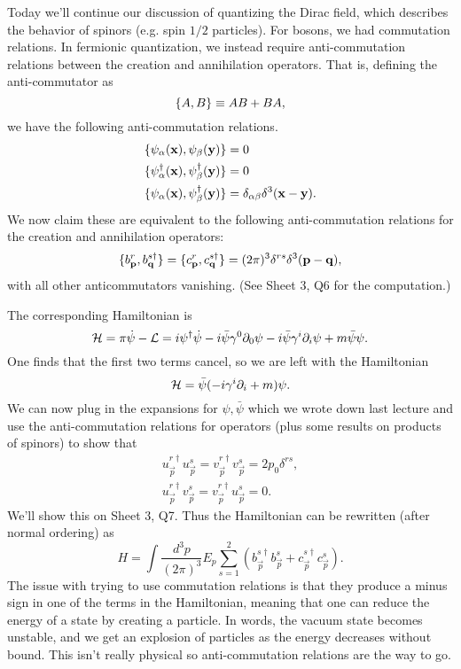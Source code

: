 Today we'll continue our discussion of quantizing the Dirac field, which describes the behavior of spinors (e.g. spin $1/2$ particles). For bosons, we had commutation relations. In fermionic quantization, we instead require anti-commutation relations between the creation and annihilation operators. That is, defining the anti-commutator as
$$\{A,B\}\equiv AB+BA,$$
we have the following anti-commutation relations.
\begin{align*}
    \{\psi_\alpha(\boldsymbol{\mathbf{x}}),\psi_\beta (\boldsymbol{\mathbf{y}})\}&=0\\
    \{\psi_\alpha^\dagger(\boldsymbol{\mathbf{x}}),\psi_\beta^\dagger(\boldsymbol{\mathbf{y}})\}&=0\\
    \{\psi_\alpha(\boldsymbol{\mathbf{x}}),\psi_\beta^\dagger(\boldsymbol{\mathbf{y}})\}&=\delta_{\alpha\beta}\delta^3(\boldsymbol{\mathbf{x}} -\boldsymbol{\mathbf{y}}).
\end{align*}
We now claim these are equivalent to the following anti-commutation relations for the creation and annihilation operators:
$$\{b_{\boldsymbol{\mathbf{p}}}^r,b_{\boldsymbol{\mathbf{q}}}^{s\dagger}\}=\{c_{\boldsymbol{\mathbf{p}}}^r, c_{\boldsymbol{\mathbf{q}}}^{s\dagger}\}=(2\pi)^3 \delta^{rs}\delta^3(\boldsymbol{\mathbf{p}} -\boldsymbol{\mathbf{q}}),$$
with all other anticommutators vanishing. (See Sheet 3, Q6 for the computation.)

The corresponding Hamiltonian is
$$\mathcal H=\pi \dot \psi -\mathcal L=i\psi^\dagger \dot \psi-i\bar \psi \gamma^0 \partial_0 \psi -i\bar \psi \gamma^i \partial_i \psi+m\bar \psi \psi.$$
One finds that the first two terms cancel, so we are left with the Hamiltonian
$$\mathcal H=\bar \psi(-i \gamma^i \partial_i +m) \psi.$$
We can now plug in the expansions for $\psi,\bar\psi$ which we wrote down last lecture and use the anti-commutation relations for operators (plus some results on products of spinors) to show that
\begin{gather*}
    u_{\vec p}^{r\dagger} u_{\vec p}^s = v_{\vec p}^{r\dagger} v_{\vec p}^s = 2p_0 \delta^{rs},\\
    u_{\vec p}^{r\dagger} v_{\vec p}^s = v_{\vec p}^{r\dagger}u_{\vec p}^s=0.
\end{gather*}
We'll show this on Sheet 3, Q7. Thus the Hamiltonian can be rewritten (after normal ordering) as
$$H=\int \frac{d^3p}{(2\pi)^3}E_p \sum_{s=1}^2 (b_{\vec p}^{s\dagger} b_{\vec p}^s + c_{\vec p}^{s\dagger}c_{\vec p}^s).$$
The issue with trying to use commutation relations is that they produce a minus sign in one of the terms in the Hamiltonian, meaning that one can reduce the energy of a state by creating a particle. In words, the vacuum state becomes unstable, and we get an explosion of particles as the energy decreases without bound. This isn't really physical so anti-commutation relations are the way to go.

